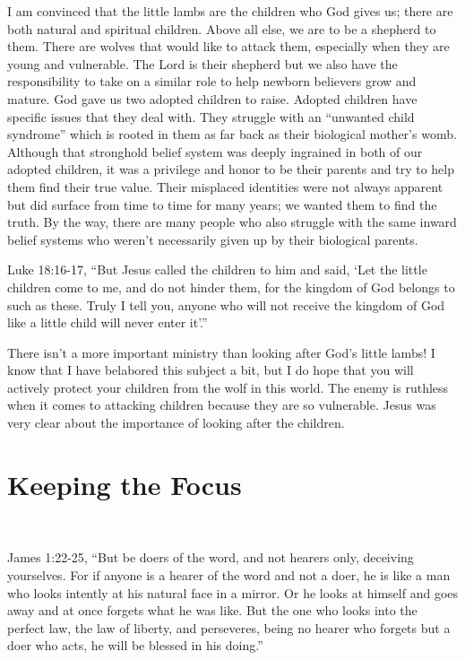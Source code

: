 \documentclass[twoside, 12pt]{book}
\begin{document}
I am convinced that the little lambs are the children who God gives us; there are both natural and spiritual children. Above all else, we are to be a shepherd to them. There are wolves that would like to attack them, especially when they are young and vulnerable. The Lord is their shepherd but we also have the responsibility to take on a similar role to help newborn believers grow and mature. God gave us two adopted children to raise. Adopted children have specific issues that they deal with. They struggle with an “unwanted child syndrome” which is rooted in them as far back as their biological mother's womb. Although that stronghold belief system was deeply ingrained in both of our adopted children, it was a privilege and honor to be their parents and try to help them find their true value. Their misplaced identities were not always apparent but did surface from time to time for many years; we wanted them to find the truth. By the way, there are many people who also struggle with the same inward belief systems who weren't necessarily given up by their biological parents.

Luke 18:16-17, “But Jesus called the children to him and said, ‘Let the little children come to me, and do not hinder them, for the kingdom of God belongs to such as these. Truly I tell you, anyone who will not receive the kingdom of God like a little child will never enter it’.”  

There isn’t a more important ministry than looking after God’s little lambs! I know that I have belabored this subject a bit, but I do hope that you will actively protect your children from the wolf in this world. The enemy is ruthless when it comes to attacking children because they are so vulnerable. Jesus was very clear about the importance of looking after the children.



\chapter{Keeping the Focus}
\

James 1:22-25, “But be doers of the word, and not hearers only, deceiving yourselves. For if anyone is a hearer of the word and not a doer, he is like a man who looks intently at his natural face in a mirror. Or he looks at himself and goes away and at once forgets what he was like. But the one who looks into the perfect law, the law of liberty, and perseveres, being no hearer who forgets but a doer who acts, he will be blessed in his doing.”
\end{document}
